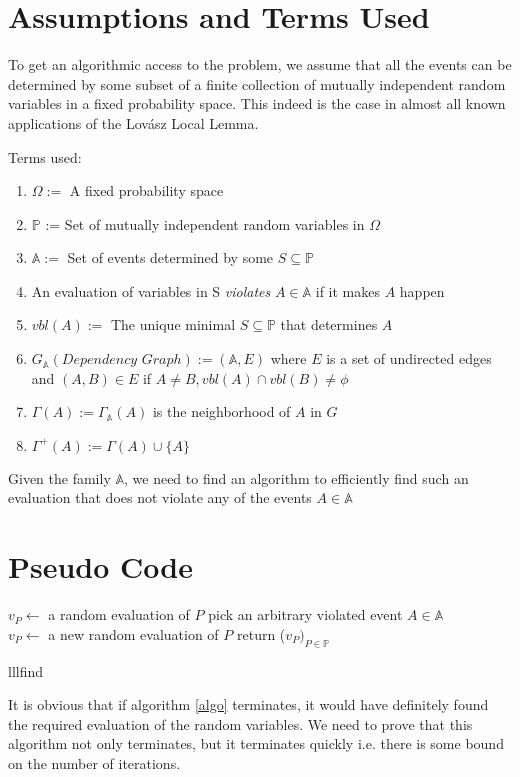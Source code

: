 \section{Assumptions and Terms Used}
To get an algorithmic access to the problem, we assume that all the events can be determined by some subset of a finite collection of mutually independent random variables in a fixed probability space. This indeed is the case in almost all known applications of the Lov\'asz Local Lemma.

Terms used:
\begin{enumerate} \itemsep -2pt
 \item $\Omega :=$ A fixed probability space
 \item $\mathbb{P}$ := Set of mutually independent random variables in $\Omega$
 \item $\mathbb{A} :=$ Set of events determined by some $S\subseteq\mathbb{P} $
 \item An evaluation of variables in S \emph{violates} $A\in\mathbb{A} $ if it makes $A$ happen
 \item $vbl(A) :=$ The unique minimal $S\subseteq\mathbb{P} $ that determines $A$
 \item $G_\mathbb{A}(Dependency\,\, Graph) := (\mathbb{A},E) $ where $E$ is a set of undirected edges and $(A,B)\in E $ if $A\neq B, vbl(A)\cap vbl(B) \neq \phi $
 \item $\Gamma(A):=\Gamma_\mathbb{A}(A) $ is the neighborhood of $A$ in $G$
 \item $\Gamma^+(A):=\Gamma(A)\cup\{A\} $
\end{enumerate}
Given the family $\mathbb{A}$, we need to find an algorithm to efficiently find such an evaluation that does not violate any of the events $A\in\mathbb{A}$

\section{Pseudo Code}
\begin{algorithm}[H]
\label{algo}
 {
  $v_P \leftarrow$ a random evaluation of $P$ }
 {
  pick an arbitrary violated event $A \in \mathbb{A}$\\
      {
    $v_P \leftarrow $ a new random evaluation of $P$
    }
  }
return ($v_P )_{P\in \mathbb{P}}$

 \caption{lllfind}
\end{algorithm}
It is obvious that if algorithm \ref{algo} terminates, it would have definitely found the required evaluation of the random variables. We need to prove that this algorithm not only terminates, but it terminates quickly i.e. there is some bound on the number of iterations.

